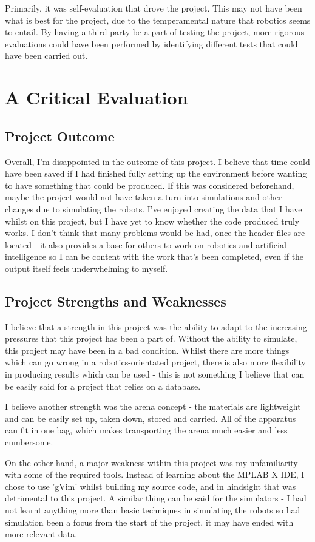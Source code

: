 Primarily, it was self-evaluation that drove the project.  This may not have
been what is best for the project, due to the temperamental nature that
robotics seems to entail.  By having a third party be a part of testing the
project, more rigorous evaluations could have been performed by identifying
different tests that could have been carried out.

\section{A Critical Evaluation}
\subsection{Project Outcome}
Overall, I'm disappointed in the outcome of this project.  I believe that
time could have been saved if I had finished fully setting up the environment
before wanting to have something that could be produced.  If this was
considered beforehand, maybe the project would not have taken a turn into
simulations and other changes due to simulating the robots.  I've enjoyed
creating the data that I have whilst on this project, but I have yet to know
whether the code produced truly works.  I don't think that many problems would
be had, once the header files are located - it also provides a base for others
to work on robotics and artificial intelligence so I can be content with the
work that's been completed, even if the output itself feels underwhelming to
myself.

\subsection{Project Strengths and Weaknesses}
I believe that a strength in this project was the ability to adapt to the
increasing pressures that this project has been a part of.  Without the ability
to simulate, this project may have been in a bad condition.  Whilst there are
more things which can go wrong in a robotics-orientated project, there is also
more flexibility in producing results which can be used - this is not something
I believe that can be easily said for a project that relies on a database.

I believe another strength was the arena concept - the materials are
lightweight and can be easily set up, taken down, stored and carried.  All of
the apparatus can fit in one bag, which makes transporting the arena much 
easier and less cumbersome.

On the other hand, a major weakness within this project was my unfamiliarity
with some of the required tools.  Instead of learning about the MPLAB X IDE, I
chose to use 'gVim' \cite{vimSite} whilst building my source code, and in
hindsight that was detrimental to this project.  A similar thing can be said
for the simulators - I had not learnt anything more than basic techniques in
simulating the robots so had simulation been a focus from the start of the
project, it may have ended with more relevant data.